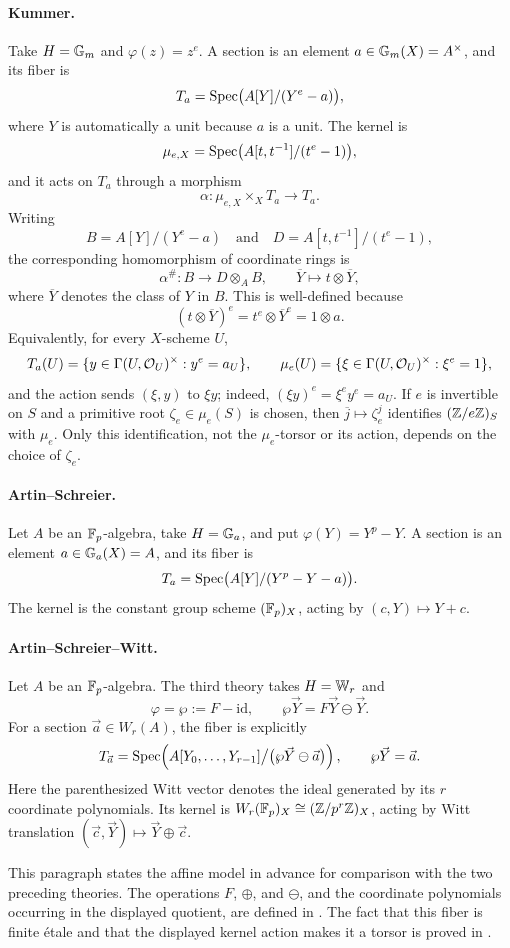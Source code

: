 \paragraph{Kummer.}
Take $H=\mathbb{G}_m$ and $\varphi(z)=z^e$. A section is an element
$a\in\mathbb{G}_m(X)=A^\times$, and its fiber is
\[
T_a=\operatorname{Spec}\bigl(A[Y]/(Y^e-a)\bigr),
\]
where $Y$ is automatically a unit because $a$ is a unit. The kernel is
\[
\mu_{e,X}=\operatorname{Spec}\bigl(A[t,t^{-1}]/(t^e-1)\bigr),
\]
and it acts on $T_a$ through a morphism
\[
\alpha:\mu_{e,X}\times_X T_a\longrightarrow T_a.
\]
Writing
\[
B=A[Y]/(Y^e-a)
\quad\text{and}\quad
D=A[t,t^{-1}]/(t^e-1),
\]
the corresponding homomorphism of coordinate rings is
\[
\alpha^\#:B\longrightarrow D\otimes_A B,
\qquad
\overline Y\longmapsto t\otimes\overline Y,
\]
where $\overline Y$ denotes the class of $Y$ in $B$. This is well-defined
because
\[
(t\otimes\overline Y)^e=t^e\otimes\overline Y^e=1\otimes a.
\]
Equivalently, for every $X$-scheme $U$,
\[
T_a(U)=\{y\in\Gamma(U,\mathcal{O}_U)^\times:y^e=a_U\},
\qquad
\mu_e(U)=\{\xi\in\Gamma(U,\mathcal{O}_U)^\times:\xi^e=1\},
\]
and the action sends $(\xi,y)$ to $\xi y$; indeed,
$(\xi y)^e=\xi^e y^e=a_U$. If $e$ is invertible on $S$ and a primitive
root $\zeta_e\in\mu_e(S)$ is chosen, then
$\overline j\mapsto\zeta_e^j$ identifies $(\mathbb{Z}/e\mathbb{Z})_S$ with $\mu_e$.
Only this identification, not the $\mu_e$-torsor or its action, depends on
the choice of $\zeta_e$.

\paragraph{Artin--Schreier.}
Let $A$ be an $\mathbb{F}_p$-algebra, take $H=\mathbb{G}_a$, and put
$\varphi(Y)=Y^p-Y$. A section is an element $a\in\mathbb{G}_a(X)=A$, and its
fiber is
\[
T_a=\operatorname{Spec}\bigl(A[Y]/(Y^p-Y-a)\bigr).
\]
The kernel is the constant group scheme $(\mathbb{F}_p)_X$, acting by
$(c,Y)\mapsto Y+c$.

\paragraph{Artin--Schreier--Witt.}
Let $A$ be an $\mathbb{F}_p$-algebra. The third theory takes $H=\mathbb{W}_r$ and
\[
\varphi=\wp:=F-\mathrm{id},
\qquad
\wp\vec Y=F\vec Y\ominus\vec Y.
\]
For a section $\vec a\in W_r(A)$, the fiber is explicitly
\[
T_{\vec a}
=\operatorname{Spec}\!\left(
  A[Y_0,\dots,Y_{r-1}]
  \big/\bigl(\wp\vec Y\ominus\vec a\bigr)
\right),
\qquad \wp\vec Y=\vec a.
\]
Here the parenthesized Witt vector denotes the ideal generated by its $r$
coordinate polynomials. Its kernel is
$W_r(\mathbb{F}_p)_X\cong(\mathbb{Z}/p^r\mathbb{Z})_X$, acting by Witt translation
$(\vec c,\vec Y)\mapsto\vec Y\oplus\vec c$.

This paragraph states the affine model in advance for comparison with the
two preceding theories. The operations $F$, $\oplus$, and $\ominus$, and the
coordinate polynomials occurring in the displayed quotient, are defined in
. The fact that this fiber is
finite \'etale and that the displayed kernel action makes it a torsor is
proved in .

